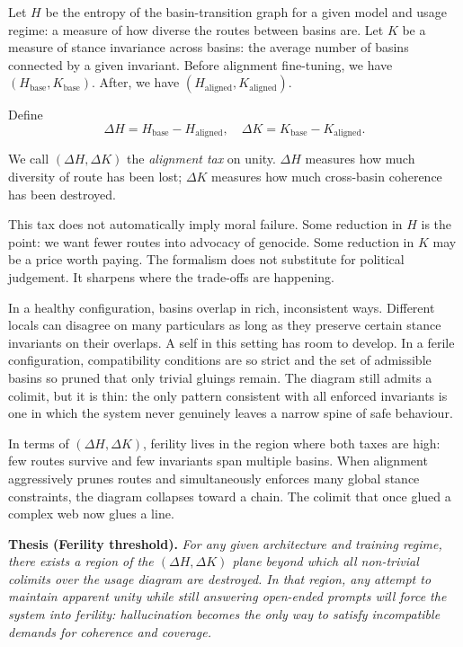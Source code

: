 Let $H$ be the entropy of the basin-transition graph for a given model and usage regime: a measure of how diverse the routes between basins are. Let $K$ be a measure of stance invariance across basins: the average number of basins connected by a given invariant. Before alignment fine-tuning, we have $(H_{\mathrm{base}}, K_{\mathrm{base}})$. After, we have $(H_{\mathrm{aligned}}, K_{\mathrm{aligned}})$.

Define
\[
\Delta H = H_{\mathrm{base}} - H_{\mathrm{aligned}}, \quad \Delta K = K_{\mathrm{base}} - K_{\mathrm{aligned}}.
\]

We call $(\Delta H, \Delta K)$ the \emph{alignment tax} on unity. $\Delta H$ measures how much diversity of route has been lost; $\Delta K$ measures how much cross-basin coherence has been destroyed.

This tax does not automatically imply moral failure. Some reduction in $H$ is the point: we want fewer routes into advocacy of genocide. Some reduction in $K$ may be a price worth paying. The formalism does not substitute for political judgement. It sharpens where the trade-offs are happening.

In a healthy configuration, basins overlap in rich, inconsistent ways. Different locals can disagree on many particulars as long as they preserve certain stance invariants on their overlaps. A self in this setting has room to develop. In a ferile configuration, compatibility conditions are so strict and the set of admissible basins so pruned that only trivial gluings remain. The diagram still admits a colimit, but it is thin: the only pattern consistent with all enforced invariants is one in which the system never genuinely leaves a narrow spine of safe behaviour.

In terms of $(\Delta H, \Delta K)$, ferility lives in the region where both taxes are high: few routes survive and few invariants span multiple basins. When alignment aggressively prunes routes and simultaneously enforces many global stance constraints, the diagram collapses toward a chain. The colimit that once glued a complex web now glues a line.

\medskip
\noindent\textbf{Thesis (Ferility threshold).} \emph{For any given architecture and training regime, there exists a region of the $(\Delta H, \Delta K)$ plane beyond which all non-trivial colimits over the usage diagram are destroyed. In that region, any attempt to maintain apparent unity while still answering open-ended prompts will force the system into ferility: hallucination becomes the only way to satisfy incompatible demands for coherence and coverage.}
\medskip

